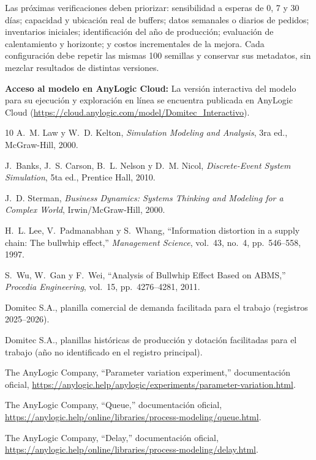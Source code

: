 \documentclass[11pt, a4paper]{article}
\begin{document}
Las próximas verificaciones deben priorizar: sensibilidad a esperas de 0, 7 y 30 días; capacidad y ubicación real de buffers; datos semanales o diarios de pedidos; inventarios iniciales; identificación del año de producción; evaluación de calentamiento y horizonte; y costos incrementales de la mejora. Cada configuración debe repetir las mismas 100 semillas y conservar sus metadatos, sin mezclar resultados de distintas versiones.

\medskip
\noindent\textbf{Acceso al modelo en AnyLogic Cloud:} La versión interactiva del modelo para su ejecución y exploración en línea se encuentra publicada en AnyLogic Cloud (\url{https://cloud.anylogic.com/model/Domitec_Interactivo}).

\begin{thebibliography}{10}
A.~M. Law y W.~D. Kelton,
\emph{Simulation Modeling and Analysis}, 3ra ed., McGraw-Hill, 2000.

J.~Banks, J.~S. Carson, B.~L. Nelson y D.~M. Nicol,
\emph{Discrete-Event System Simulation}, 5ta ed., Prentice Hall, 2010.

J.~D. Sterman,
\emph{Business Dynamics: Systems Thinking and Modeling for a Complex World},
Irwin/McGraw-Hill, 2000.

H.~L. Lee, V.~Padmanabhan y S.~Whang,
``Information distortion in a supply chain: The bullwhip effect,''
\emph{Management Science}, vol.~43, no.~4, pp.~546--558, 1997.

S.~Wu, W.~Gan y F.~Wei,
``Analysis of Bullwhip Effect Based on ABMS,''
\emph{Procedia Engineering}, vol.~15, pp.~4276--4281, 2011.

Domitec S.A., planilla comercial de demanda facilitada para el trabajo (registros 2025--2026).

Domitec S.A., planillas históricas de producción y dotación facilitadas para el trabajo (año no identificado en el registro principal).

The AnyLogic Company, ``Parameter variation experiment,'' documentación oficial,
\url{https://anylogic.help/anylogic/experiments/parameter-variation.html}.

The AnyLogic Company, ``Queue,'' documentación oficial,
\url{https://anylogic.help/online/libraries/process-modeling/queue.html}.

The AnyLogic Company, ``Delay,'' documentación oficial,
\url{https://anylogic.help/online/libraries/process-modeling/delay.html}.
\end{thebibliography}
\end{document}
